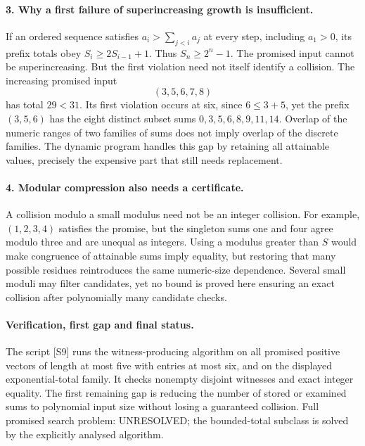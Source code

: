 \documentclass[11pt,a4paper]{article}
\begin{document}
\paragraph{3. Why a first failure of superincreasing growth is insufficient.}
If an ordered sequence satisfies
$a_i>\sum_{j<i}a_j$ at every step, including $a_1>0$, its prefix
totals obey $S_i\ge2S_{i-1}+1$. Thus $S_n\ge2^n-1$.
The promised input cannot be superincreasing. But the first violation
need not itself identify a collision. The increasing promised input
\[
                         (3,5,6,7,8)
\]
has total $29<31$. Its first violation occurs at six, since
$6\le3+5$, yet the prefix $(3,5,6)$ has the eight distinct subset
sums $0,3,5,6,8,9,11,14$. Overlap of the numeric ranges of two
families of sums does not imply overlap of the discrete families.
The dynamic program handles this gap by retaining all attainable
values, precisely the expensive part that still needs replacement.

\paragraph{4. Modular compression also needs a certificate.}
A collision modulo a small modulus need not be an integer collision.
For example, $(1,2,3,4)$ satisfies the promise, but the singleton
sums one and four agree modulo three and are unequal as integers.
Using a modulus greater than $S$ would make congruence of attainable
sums imply equality, but restoring that many possible residues
reintroduces the same numeric-size dependence. Several small moduli
may filter candidates, yet no bound is proved here ensuring an exact
collision after polynomially many candidate checks.

\paragraph{Verification, first gap and final status.}
The script [S9] runs the witness-producing algorithm on all
promised positive vectors of length at most five with entries at
most six, and on the displayed exponential-total family. It checks
nonempty disjoint witnesses and exact integer equality. The first
remaining gap is reducing the number of stored or examined sums
to polynomial input size without losing a guaranteed collision.
Full promised search problem: UNRESOLVED; the bounded-total subclass
is solved by the explicitly analysed algorithm.
\end{document}
